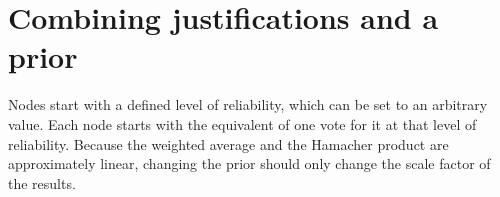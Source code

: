 \section{Combining justifications and a prior}

Nodes start with a defined level of reliability, which can be set to an
arbitrary value. Each node starts with the equivalent of one vote for it at
that level of reliability. Because the weighted average and the Hamacher
product are approximately linear, changing the prior should only change the
scale factor of the results.


